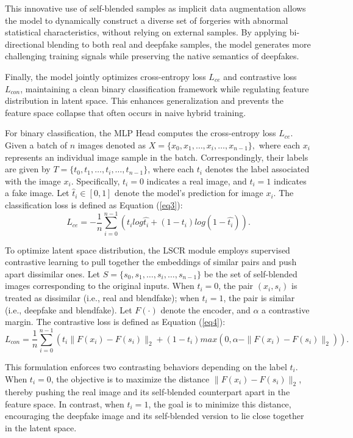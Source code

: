 \documentclass[final,5p,times]{elsarticle}
\begin{document}
This innovative use of self-blended samples as implicit data augmentation allows the model to dynamically construct a diverse set of forgeries with abnormal statistical characteristics, without relying on external samples. By applying bi-directional blending to both real and deepfake samples, the model generates more challenging training signals while preserving the native semantics of deepfakes.

Finally, the model jointly optimizes cross-entropy loss $L_{ce}$ and contrastive loss $L_{con}$, maintaining a clean binary classification framework while regulating feature distribution in latent space. This enhances generalization and prevents the feature space collapse that often occurs in naive hybrid training.

For binary classification, the MLP Head computes the cross-entropy loss $L_{ce}$. Given a batch of $n$ images denoted as $X=\{x_0,x_1,\dots,x_i,\dots,x_{n-1}\},$ where each $x_i$ represents an individual image sample in the batch. Correspondingly, their labels are given by $T=\{t_0,t_1,\dots,t_i,\dots,t_{n-1}\}$, where each $t_i$ denotes the label associated with the image $x_i$. Specifically, $t_i=0$ indicates a real image, and $t_i=1$ indicates a fake image. Let $\hat{t}_i \in [0,1]$ denote the model's prediction for image $x_i$. The classification loss is defined as Equation (\ref{eq3}):
\begin{equation} \label{eq3}
L_{ce}=-\frac{1}{n} \sum_{i=0}^{n-1}(t_ilog⁡\hat{t_i}+(1-t_i)log⁡(1-\hat{t_i})).
\end{equation}

To optimize latent space distribution, the LSCR module employs supervised contrastive learning to pull together the embeddings of similar pairs and push apart dissimilar ones. Let $S= \{s_0,s_1,\dots,s_i,\dots,s_{n-1}\}$ be the set of self-blended images corresponding to the original inputs. When $t_i=0$, the pair $(x_i,s_i)$ is treated as dissimilar (i.e., real and blendfake); when $t_i=1$, the pair is similar (i.e., deepfake and blendfake). Let $F(\cdot)$ denote the encoder, and $\alpha$ a contrastive margin. The contrastive loss is defined as Equation (\ref{eq4}):
\begin{equation} \label{eq4}
L_{con}=\frac{1}{n}\sum_{i=0}^{n-1}(t_i\|F(x_i)-F(s_i)\|_2+(1-t_i)max(0,\alpha-\|F(x_i)-F(s_i)\|_2)).
\end{equation}

This formulation enforces two contrasting behaviors depending on the label \( t_i \). When \( t_i = 0 \), the objective is to maximize the distance \( \|F(x_i) - F(s_i)\|_2 \), thereby pushing the real image and its self-blended counterpart apart in the feature space. In contrast, when \( t_i = 1 \), the goal is to minimize this distance, encouraging the deepfake image and its self-blended version to lie close together in the latent space.
\end{document}

